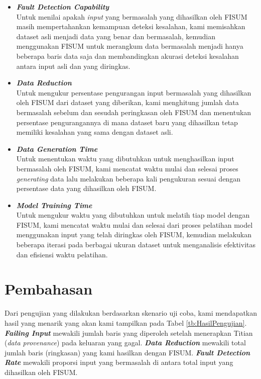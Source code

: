 \begin{itemize}
  \item \emph{\textbf{Fault Detection Capability}} \\
  Untuk menilai apakah \emph{input} yang bermasalah yang 
  dihasilkan oleh FISUM masih mempertahankan kemampuan 
  deteksi kesalahan, kami memisahkan dataset asli 
  menjadi data yang benar dan bermasalah, kemudian 
  menggunakan FISUM untuk merangkum data bermasalah 
  menjadi hanya beberapa baris data saja
  dan membandingkan akurasi deteksi kesalahan antara 
  input asli dan yang diringkas.
  \item \emph{\textbf{Data Reduction}} \\
  Untuk mengukur persentase pengurangan input bermasalah 
  yang dihasilkan oleh FISUM dari dataset yang diberikan, 
  kami menghitung jumlah data bermasalah sebelum dan 
  sesudah peringkasan oleh FISUM dan menentukan persentase 
  pengurangannya di mana dataset baru yang dihasilkan
  tetap memiliki kesalahan yang sama dengan dataset asli.
  \item \emph{\textbf{Data Generation Time}} \\
  Untuk menentukan waktu yang dibutuhkan untuk 
  menghasilkan input bermasalah oleh FISUM, kami 
  mencatat waktu mulai dan selesai proses \emph{generating} data 
  lalu melakukan beberapa kali pengukuran sesuai
  dengan persentase data yang dihasilkan oleh FISUM.
  \item \emph{\textbf{Model Training Time}} \\
  Untuk mengukur waktu yang dibutuhkan untuk melatih 
  tiap model dengan FISUM, kami mencatat waktu mulai 
  dan selesai dari proses pelatihan model menggunakan 
  input yang telah diringkas oleh FISUM, kemudian 
  melakukan beberapa iterasi pada berbagai ukuran 
  dataset untuk menganalisis efektivitas dan efisiensi 
  waktu pelatihan.
\end{itemize}

\section{Pembahasan}
\label{sec:pembahasan}

Dari pengujian yang dilakukan berdasarkan skenario uji coba,
kami mendapatkan hasil yang menarik yang akan kami tampilkan
pada Tabel \ref{tb:HasilPengujian}.
\emph{\textbf{Failing Input}} mewakili jumlah baris 
yang diperoleh setelah menerapkan Titian 
(\emph{data provenance}) pada keluaran yang gagal. 
\emph{\textbf{Data Reduction}} mewakili total jumlah 
baris (ringkasan) yang kami hasilkan dengan FISUM. 
\emph{\textbf{Fault Detection Rate}} mewakili proporsi 
input yang bermasalah di antara total input yang 
dihasilkan oleh FISUM.

